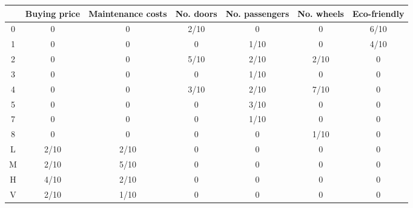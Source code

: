 \begin{tabular}{ccccccc}
\toprule
{} & Buying price & Maintenance costs & No. doors & No. passengers & No. wheels & Eco-friendly \\
\midrule
0 &            0 &                 0 &      2/10 &              0 &          0 &         6/10 \\
1 &            0 &                 0 &         0 &           1/10 &          0 &         4/10 \\
2 &            0 &                 0 &      5/10 &           2/10 &       2/10 &            0 \\
3 &            0 &                 0 &         0 &           1/10 &          0 &            0 \\
4 &            0 &                 0 &      3/10 &           2/10 &       7/10 &            0 \\
5 &            0 &                 0 &         0 &           3/10 &          0 &            0 \\
7 &            0 &                 0 &         0 &           1/10 &          0 &            0 \\
8 &            0 &                 0 &         0 &              0 &       1/10 &            0 \\
L &         2/10 &              2/10 &         0 &              0 &          0 &            0 \\
M &         2/10 &              5/10 &         0 &              0 &          0 &            0 \\
H &         4/10 &              2/10 &         0 &              0 &          0 &            0 \\
V &         2/10 &              1/10 &         0 &              0 &          0 &            0 \\
\bottomrule
\end{tabular}
